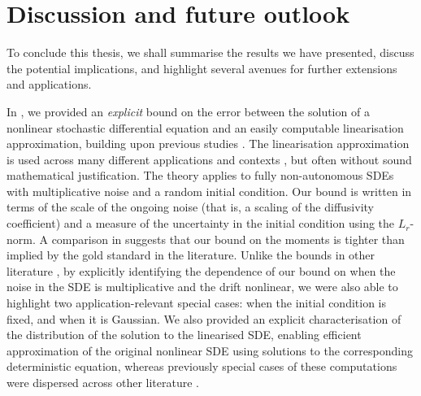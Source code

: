 \chapter{Discussion and future outlook}\label{ch:outlook}
To conclude this thesis, we shall summarise the results we have presented, discuss the potential implications, and highlight several avenues for further extensions and applications.

In , we provided an \emph{explicit} bound on the error between the solution of a nonlinear stochastic differential equation and an easily computable linearisation approximation, building upon previous studies \citep{Blagoveshchenskii_1962_DiffusionProcessesDepending,FreidlinWentzell_1998_RandomPerturbationsDynamical,Sanz-AlonsoStuart_2017_GaussianApproximationsSmall}.
The linearisation approximation is used across many different applications and contexts \citep[e.g.]{Jazwinski_2014_StochasticProcessesFiltering, Sanz-AlonsoStuart_2017_GaussianApproximationsSmall,KaszasHaller_2020_UniversalUpperEstimate,ArchambeauEtAl_2007_GaussianProcessApproximations}, but often without sound mathematical justification.
The theory applies to fully non-autonomous SDEs with multiplicative noise and a random initial condition.
Our bound is written in terms of the scale of the ongoing noise (that is, a scaling of the diffusivity coefficient) and a measure of the uncertainty in the initial condition using the \(L_r\)-norm.
A comparison in  suggests that our bound on the moments is tighter than implied by the gold standard \citep{Sanz-AlonsoStuart_2017_GaussianApproximationsSmall} in the literature.
Unlike the bounds in other literature \citep[e.g.]{Blagoveshchenskii_1962_DiffusionProcessesDepending,FreidlinWentzell_1998_RandomPerturbationsDynamical}, by explicitly identifying the dependence of our bound on when the noise in the SDE is multiplicative and the drift nonlinear, we were also able to highlight two application-relevant special cases: when the initial condition is fixed, and when it is Gaussian.
We also provided an explicit characterisation of the distribution of the solution to the linearised SDE, enabling efficient approximation of the original nonlinear SDE using solutions to the corresponding deterministic equation, whereas previously special cases of these computations were dispersed across other literature \citep[e.g.]{Jazwinski_2014_StochasticProcessesFiltering,Sanz-AlonsoStuart_2017_GaussianApproximationsSmall,SarkkaSolin_2019_AppliedStochasticDifferential}.

